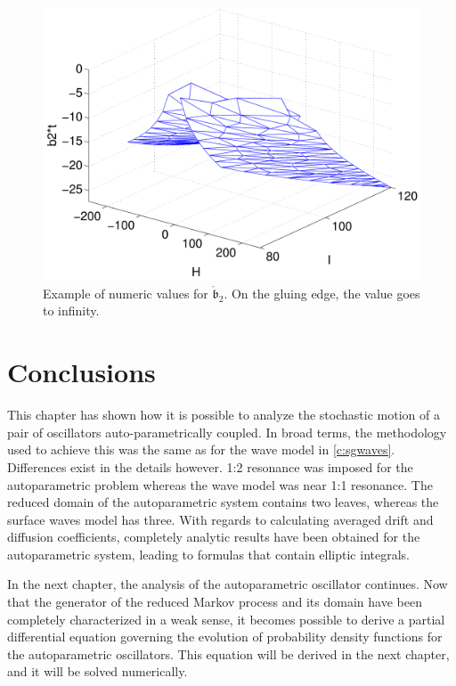 \begin{figure}
\begin{center}
\includegraphics[width=\textwidth*7/8]{figures/b2_circ}
\caption{Example of numeric values for $\mathring{\mathfrak b}_2$. On the gluing edge, the value goes to infinity.}
\label{F:b2_circ}
\end{center}
\end{figure}


\section{Conclusions}

This chapter has shown how it is possible to analyze the stochastic motion of a pair of oscillators auto-parametrically coupled. In broad terms, the methodology used to achieve this was the same as for the wave model in \ref{c:sgwaves}. Differences exist in the details however. 1:2 resonance was imposed for the autoparametric problem whereas the wave model was near 1:1 resonance. The reduced domain of the autoparametric system contains two leaves, whereas the surface waves model has three. With regards to calculating averaged drift and diffusion coefficients, completely analytic results have been obtained for the autoparametric system, leading to formulas that contain elliptic integrals.

In the next chapter, the analysis of the autoparametric oscillator continues. Now that the generator of the reduced Markov process and its domain have been completely characterized in a weak sense, it becomes possible to derive a partial differential equation governing the evolution of probability density functions for the autoparametric oscillators. This equation will be derived in the next chapter, and it will be solved numerically.

